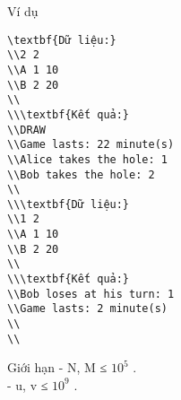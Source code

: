 Ví dụ
\begin{verbatim}
\textbf{Dữ liệu:}
\\2 2
\\A 1 10
\\B 2 20
\\
\\\textbf{Kết quả:}
\\DRAW
\\Game lasts: 22 minute(s)
\\Alice takes the hole: 1
\\Bob takes the hole: 2
\\
\\\textbf{Dữ liệu:}
\\1 2
\\A 1 10
\\B 2 20
\\
\\\textbf{Kết quả:}
\\Bob loses at his turn: 1
\\Game lasts: 2 minute(s)
\\
\\\end{verbatim}
Giới hạn
- N, M ≤ $10^{5}$   .   
\\   - u, v ≤ $10^{9}$   .